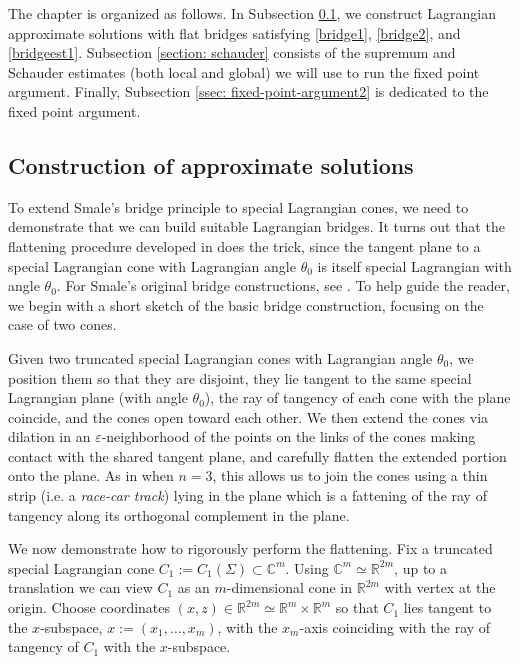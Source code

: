 \documentclass[11pt]{amsart}
\theoremstyle{definition}
\theoremstyle{remark}
\newcommand{\C}{\mathbb{C}}
\newcommand{\R}{\mathbb{R}}
\begin{document}
The chapter is organized as follows. In Subsection \ref{section: approxsoln}, we construct Lagrangian approximate solutions with flat bridges satisfying \eqref{bridge1}, \eqref{bridge2}, and \eqref{bridgeest1}. Subsection \ref{section: schauder} consists of the supremum and Schauder estimates (both local and global) we will use to run the fixed point argument. Finally, Subsection \ref{ssec: fixed-point-argument2} is dedicated to the fixed point argument.

\subsection{Construction of approximate solutions}\label{section: approxsoln}
To extend Smale's bridge principle to special Lagrangian cones, we need to demonstrate that we can build suitable Lagrangian bridges. It turns out that the flattening procedure developed in \cite[Section 7.2]{Dim25} does the trick, since the tangent plane to a special Lagrangian cone with Lagrangian angle $\theta_0$ is itself special Lagrangian with angle $\theta_0$. For Smale's original bridge constructions, see \cite[Section 2]{Sm87}. To help guide the reader, we begin with a short sketch of the basic bridge construction, focusing on the case of two cones.

Given two truncated special Lagrangian cones with Lagrangian angle $\theta_0$, we position them so that they are disjoint, they lie tangent to the same special Lagrangian plane (with angle $\theta_0$), the ray of tangency of each cone with the plane coincide, and the cones open toward each other. We then extend the cones via dilation in an $\varepsilon$-neighborhood of the points on the links of the cones making contact with the shared tangent plane, and carefully flatten the extended portion onto the plane. As in \cite[Section 7.2]{Dim25} when $n = 3$, this allows us to join the cones using a thin strip (i.e. a \emph{race-car track}) lying in the plane which is a fattening of the ray of tangency along its orthogonal complement in the plane.

We now demonstrate how to rigorously perform the flattening. Fix a truncated special Lagrangian cone $C_1 := C_1(\Sigma) \subset \C^m$. Using $\C^m \simeq \R^{2m}$, up to a translation we can view $C_1$ as an $m$-dimensional cone in $\R^{2m}$ with vertex at the origin. Choose coordinates $(x,z) \in \R^{2m} \simeq \R^m \times \R^m$ so that $C_1$ lies tangent to the $x$-subspace, $x := (x_1,\ldots, x_m)$, with the $x_m$-axis coinciding with the ray of tangency of $C_1$ with the $x$-subspace. 
\end{document}
